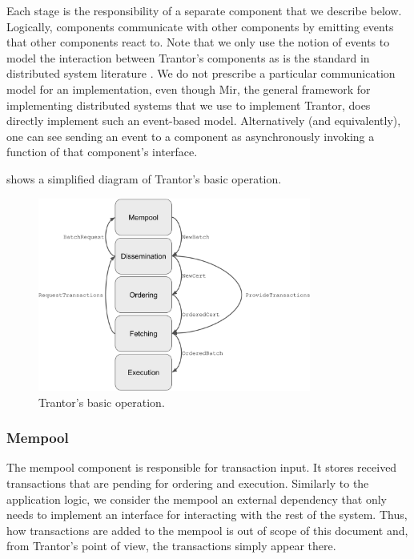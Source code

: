 \documentclass{article}
\begin{document}
Each stage is the responsibility of a separate component that we describe below.
Logically, components communicate with other components by emitting events that other components react to.
Note that we only use the notion of events to model the interaction between Trantor's components
as is the standard in distributed system literature \cite{distributedprogrammingbook}.
We do not prescribe a particular communication model for an implementation,
even though Mir, the general framework for implementing distributed systems \cite{mir} that we use to implement Trantor,
does directly implement such an event-based model.
Alternatively (and equivalently), one can see sending an event to a component as asynchronously invoking a function of that component's interface.

 shows a simplified diagram of Trantor’s basic operation.

\begin{figure}[h]
    \centering
    \includegraphics[width=0.8\textwidth]{figures/basic-operation.png}
    \caption{Trantor's basic operation.}
    \label{fig:basic-operation}
\end{figure}

\subsubsection{Mempool}
\label{sec:mempool}

The mempool component is responsible for transaction input.
It stores received transactions that are pending for ordering and execution.
Similarly to the application logic, we consider the mempool an external dependency
that only needs to implement an interface for interacting with the rest of the system.
Thus, how transactions are added to the mempool is out of scope of this document and,
from Trantor’s point of view, the transactions simply appear there.
\end{document}

